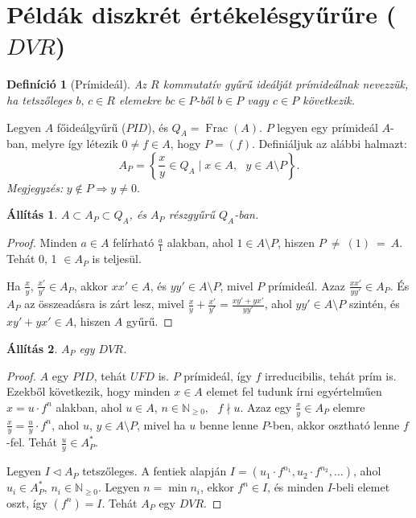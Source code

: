 \documentclass[12pt, notitlepage]{article}
\newtheorem*{definicio}{Definíció}
\newtheorem*{allitas}{Állítás}
\begin{document}
\section*{Példák diszkrét értékelésgyűrűre ($DVR$)}

\begin{definicio}[Prímideál]
    Az $R$ kommutatív gyűrű ideálját prímideálnak nevezzük, ha tetszőleges $b \text{, }c \in R$ elemekre $bc \in P$-ből $b\in P$ vagy $c \in P$ következik.
\end{definicio}

Legyen $A$ főideálgyűrű ($PID$), és $Q_A = \operatorname{Frac}(A)$. $P$ legyen egy prímideál $A$-ban, melyre így létezik $0 \neq f \in A$, hogy $P = (f)$. Definiáljuk az alábbi halmazt:
\[A_P = \left\{ \frac{x}{y} \in Q_A \mid x \in A, \text{ } y \in A\setminus P\right\} \text{.}\]
\textit{Megjegyzés:} $y \notin P \Longrightarrow y \neq 0$.

\begin{allitas}
    $A \subset A_P \subset Q_A$, és $A_P$ részgyűrű $Q_A$-ban.
\end{allitas}
\begin{proof}
    Minden $a \in A$ felírható $\frac{a}{1}$ alakban, ahol $1 \in A \setminus P$, hiszen $P~\neq~(1)~=~A$. Tehát 0, 1 $\in A_P$ is teljesül.

    Ha $\frac{x}{y}$, $\frac{x'}{y'} \in A_P$, akkor $xx' \in A$, és $yy' \in A \setminus P$, mivel $P$ prímideál. Azaz $\frac{xx'}{yy'} \in A_P$. És $A_P$ az összeadásra is zárt lesz, mivel $\frac{x}{y}+\frac{x'}{y'} = \frac{xy' + yx'}{yy'}$, ahol $yy' \in A \setminus P$ szintén, és $xy' + yx' \in A$, hiszen $A$ gyűrű. 
\end{proof}

\begin{allitas}
    $A_P$ egy $DVR$.
\end{allitas}
\begin{proof}
    $A$ egy $PID$, tehát $UFD$ is. $P$ prímideál, így $f$ irreducibilis, tehát prím is. Ezekből következik, hogy minden $x \in A$ elemet fel tudunk írni egyértelműen $x = u \cdot f^n$ alakban, ahol $u \in A$, $n \in \mathbb{N}_{\geq 0}, \text{ } f \nmid u$. Azaz egy $\frac{x}{y} \in A_P$ elemre $\frac{x}{y} = \frac{u}{y} \cdot f^n$, ahol $u$, $y \in A \setminus P$, mivel ha $u$ benne lenne $P$-ben, akkor osztható lenne $f$-fel. Tehát $\frac{u}{y} \in A_P^*$.

    Legyen $I \triangleleft A_P$ tetszőleges. A fentiek alapján $I = (u_1 \cdot f^{n_1}, u_2 \cdot f^{n_2}, \dots)$, ahol $u_i \in A_P^*$, $n_i \in\mathbb{N}_{\geq 0}$. Legyen $n = \min n_i$, ekkor $f^n \in I$, és minden $I$-beli elemet oszt, így $(f^n) = I$. Tehát $A_P$ egy $DVR$.
\end{proof}
\end{document}
